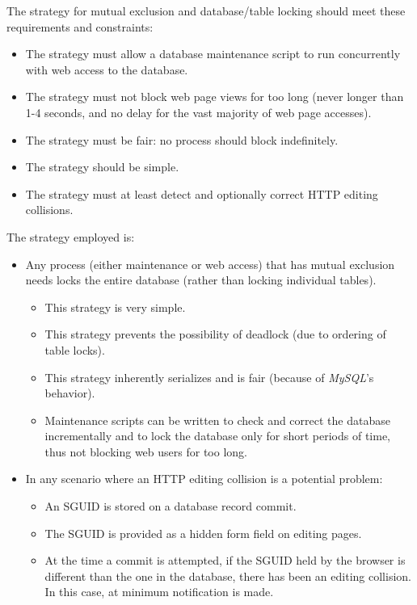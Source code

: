 \documentclass[letterpaper,10pt,titlepage]{article}
\begin{document}
The strategy for mutual exclusion and database/table locking should meet
these requirements and constraints:

\begin{itemize}
\item The strategy must allow a database maintenance script to run concurrently
      with web access to the database.
\item The strategy must not block web page views for too long (never longer than 1-4 seconds,
      and no delay for the vast majority of web page accesses).
\item The strategy must be fair:  no process should block indefinitely.
\item The strategy should be simple.
\item The strategy must at least detect and optionally correct HTTP editing collisions. 
\end{itemize}

The strategy employed is:

\begin{itemize}
\item Any process (either maintenance or web access) that has mutual exclusion needs
      locks the entire database (rather than locking individual tables).
      \begin{itemize}
      \item This strategy is very simple.
      \item This strategy prevents the possibility of deadlock (due to ordering of table locks).
      \item This strategy inherently serializes and is fair (because of \emph{MySQL}'s behavior).
      \item Maintenance scripts can be written to check and correct the database
            incrementally and to lock the database only for short periods of time,
            thus not blocking web users for too long.
      \end{itemize}
\item In any scenario where an HTTP editing collision is a potential problem:
      \begin{itemize}
      \item An SGUID is stored on a database record commit.
      \item The SGUID is provided as a hidden form field on editing pages.
      \item At the time a commit is attempted, if the SGUID held by the browser is different than the
            one in the database, there has been an editing collision.  In this case, at minimum
            notification is made.
      \end{itemize}
\end{itemize}
\end{document}

